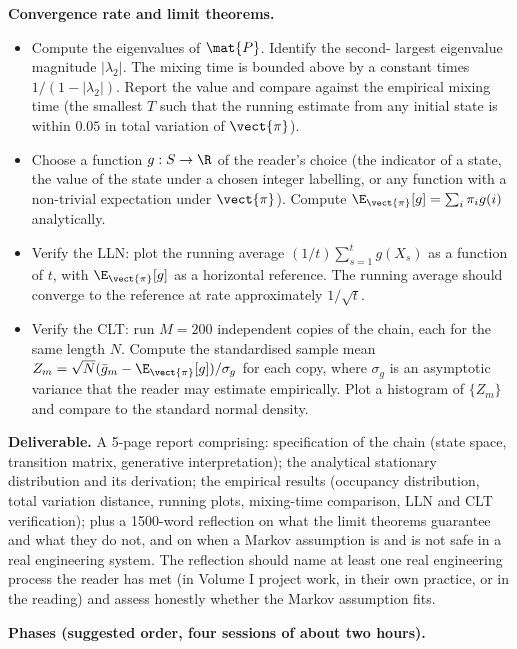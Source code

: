 \begin{project}
\textbf{Convergence rate and limit theorems.}

\begin{itemize}[leftmargin=*]
  \item Compute the eigenvalues of $\mat{P}$. Identify the second-
    largest eigenvalue magnitude $|\lambda_{2}|$. The mixing time
    is bounded above by a constant times $1/(1 - |\lambda_{2}|)$.
    Report the value and compare against the empirical mixing time
    (the smallest $T$ such that the running estimate from any
    initial state is within $0.05$ in total variation of
    $\vect{\pi}$).
  \item Choose a function $g : S \to \R$ of the reader's choice
    (the indicator of a state, the value of the state under a
    chosen integer labelling, or any function with a non-trivial
    expectation under $\vect{\pi}$). Compute $\E_{\vect{\pi}}[g] =
    \sum_{i} \pi_{i} g(i)$ analytically.
  \item Verify the LLN: plot the running average $(1/t)
    \sum_{s=1}^{t} g(X_{s})$ as a function of $t$, with
    $\E_{\vect{\pi}}[g]$ as a horizontal reference. The running
    average should converge to the reference at rate
    approximately $1/\sqrt{t}$.
  \item Verify the CLT: run $M = 200$ independent copies of the
    chain, each for the same length $N$. Compute the standardised
    sample mean $Z_{m} = \sqrt{N}(\bar g_{m} -
    \E_{\vect{\pi}}[g])/\sigma_{g}$ for each copy, where
    $\sigma_{g}$ is an asymptotic variance that the reader may
    estimate empirically. Plot a histogram of $\{Z_{m}\}$ and
    compare to the standard normal density.
\end{itemize}

\textbf{Deliverable.} A 5-page report comprising:
specification of the chain (state space, transition matrix,
generative interpretation); the analytical stationary distribution
and its derivation; the empirical results (occupancy distribution,
total variation distance, running plots, mixing-time comparison,
LLN and CLT verification); plus a 1500-word reflection on what the
limit theorems guarantee and what they do not, and on when a
Markov assumption is and is not safe in a real engineering system.
The reflection should name at least one real engineering process
the reader has met (in Volume I project work, in their own
practice, or in the reading) and assess honestly whether the Markov
assumption fits.

\smallskip
\textbf{Phases (suggested order, four sessions of about two hours).}


\end{project}
